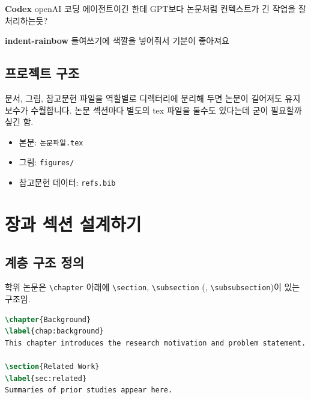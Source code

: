 \documentclass[doctor, korean]{pnuthesis_me}
\begin{document}
\textbf{Codex} openAI 코딩 에이전트이긴 한데 GPT보다 논문처럼 컨텍스트가 긴 작업을 잘 처리하는듯?

\textbf{indent-rainbow} 들여쓰기에 색깔을 넣어줘서 기분이 좋아져요

\section{프로젝트 구조}
문서, 그림, 참고문헌 파일을 역할별로 디렉터리에 분리해 두면 논문이 길어져도 유지 보수가 수월합니다.
논문 섹션마다 별도의 tex 파일을 둘수도 있다는데 굳이 필요할까 싶긴 함.
\begin{itemize}
    \item 본문: \texttt{논문파일.tex}
    \item 그림: \texttt{figures/}
    \item 참고문헌 데이터: \texttt{refs.bib}
\end{itemize}


\chapter{장과 섹션 설계하기}
\section{계층 구조 정의}\label{sec:structure}
학위 논문은 \verb|\chapter| 아래에 \verb|\section|, \verb|\subsection| (, \verb|\subsubsection|)이 있는 구조임.
\begin{lstlisting}[language=TeX]
\chapter{Background}
\label{chap:background}
This chapter introduces the research motivation and problem statement.

\section{Related Work}
\label{sec:related}
Summaries of prior studies appear here.
\end{lstlisting}
\end{document}
